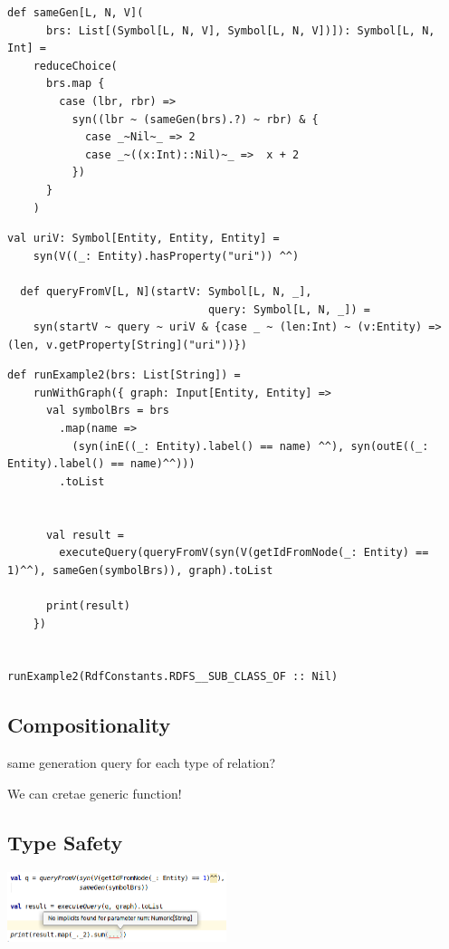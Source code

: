 \begin{lstlisting}
def sameGen[L, N, V](
      brs: List[(Symbol[L, N, V], Symbol[L, N, V])]): Symbol[L, N, Int] =
    reduceChoice(
      brs.map {
        case (lbr, rbr) =>
          syn((lbr ~ (sameGen(brs).?) ~ rbr) & {
            case _~Nil~_ => 2
            case _~((x:Int)::Nil)~_ =>  x + 2
          })
      }
    )
\end{lstlisting}

\begin{lstlisting}
val uriV: Symbol[Entity, Entity, Entity] =
    syn(V((_: Entity).hasProperty("uri")) ^^)

  def queryFromV[L, N](startV: Symbol[L, N, _],
                               query: Symbol[L, N, _]) =
    syn(startV ~ query ~ uriV & {case _ ~ (len:Int) ~ (v:Entity) => (len, v.getProperty[String]("uri"))})
	\end{lstlisting}



\begin{lstlisting}
def runExample2(brs: List[String]) =
    runWithGraph({ graph: Input[Entity, Entity] =>
      val symbolBrs = brs
        .map(name =>
          (syn(inE((_: Entity).label() == name) ^^), syn(outE((_: Entity).label() == name)^^)))
        .toList


      val result =
        executeQuery(queryFromV(syn(V(getIdFromNode(_: Entity) == 1)^^), sameGen(symbolBrs)), graph).toList

      print(result)
    })


runExample2(RdfConstants.RDFS__SUB_CLASS_OF :: Nil)

\end{lstlisting}

\subsection{Compositionality}

same generation query for each type of relation?

We can cretae generic function!

\subsection{Type Safety}

\includegraphics[width=0.48\textwidth]{pictures/image.png}

